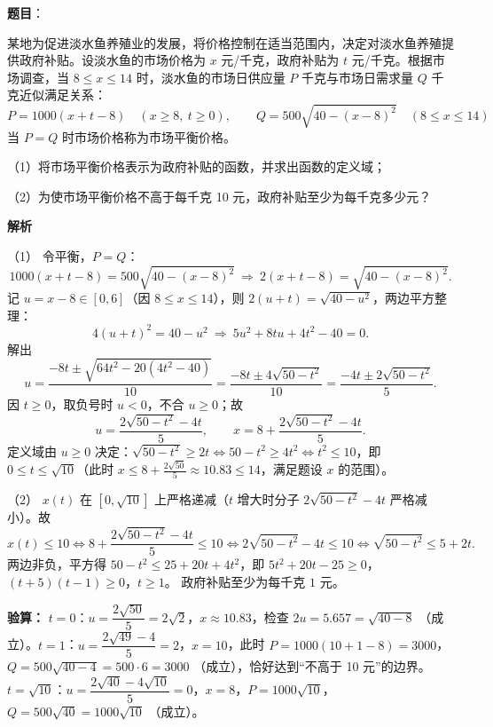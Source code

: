 \begin{answer}

\par\medskip

\end{answer}
\begin{answer}

\textbf{题目}：

某地为促进淡水鱼养殖业的发展，将价格控制在适当范围内，决定对淡水鱼养殖提供政府补贴。设淡水鱼的市场价格为 $x$ 元/千克，政府补贴为 $t$ 元/千克。根据市场调查，当 $8\le x\le14$ 时，淡水鱼的市场日供应量 $P$ 千克与市场日需求量 $Q$ 千克近似满足关系：
\nopagebreak[4]
\[
P=1000(x+t-8)\quad(x\ge8,\ t\ge0),\qquad
Q=500\sqrt{40-(x-8)^2}\quad(8\le x\le14)
\]
当 $P=Q$ 时市场价格称为市场平衡价格。

（1）将市场平衡价格表示为政府补贴的函数，并求出函数的定义域；

（2）为使市场平衡价格不高于每千克 10 元，政府补贴至少为每千克多少元？

\textbf{解析}

（1） 令平衡，$P=Q$：
\nopagebreak[4]
\[1000(x+t-8)=500\sqrt{40-(x-8)^2}\ \Longrightarrow\ 2(x+t-8)=\sqrt{40-(x-8)^2}.\]
记 $u=x-8\in[0,6]$（因 $8\le x\le14$），则 $2(u+t)=\sqrt{40-u^2}$，两边平方整理：
\nopagebreak[4]
\[4(u+t)^2=40-u^2\ \Longrightarrow\ 5u^2+8tu+4t^2-40=0.\]
解出
\nopagebreak[4]
\[u=\frac{-8t\pm\sqrt{64t^2-20(4t^2-40)}}{10}=\frac{-8t\pm4\sqrt{50-t^2}}{10}=\frac{-4t\pm2\sqrt{50-t^2}}{5}.\]
因 $t\ge0$，取负号时 $u<0$，不合 $u\ge0$；故
\nopagebreak[4]
\[u=\frac{2\sqrt{50-t^2}-4t}{5},\qquad x=8+\frac{2\sqrt{50-t^2}-4t}{5}.\]
定义域由 $u\ge0$ 决定：$\sqrt{50-t^2}\ge2t\iff 50-t^2\ge4t^2\iff t^2\le10$，即 $0\le t\le\sqrt{10}$（此时 $x\le8+\frac{2\sqrt{50}}{5}\approx10.83\le14$，满足题设 $x$ 的范围）。

（2） $x(t)$ 在 $[0,\sqrt{10}]$ 上严格递减（$t$ 增大时分子 $2\sqrt{50-t^2}-4t$ 严格减小）。故
\nopagebreak[4]
\[x(t)\le10\iff 8+\frac{2\sqrt{50-t^2}-4t}{5}\le10\iff 2\sqrt{50-t^2}-4t\le10\iff \sqrt{50-t^2}\le 5+2t.\]
两边非负，平方得 $50-t^2\le25+20t+4t^2$，即 $5t^2+20t-25\ge0$，$(t+5)(t-1)\ge0$，$t\ge1$。
政府补贴至少为每千克 $1$ 元。

\textbf{验算：} $t=0$：$u=\dfrac{2\sqrt{50}}{5}=2\sqrt2$，$x\approx10.83$，检查 $2u=5.657=\sqrt{40-8}$ （成立）。$t=1$：$u=\dfrac{2\sqrt{49}-4}{5}=2$，$x=10$，此时 $P=1000(10+1-8)=3000$，$Q=500\sqrt{40-4}=500\cdot6=3000$ （成立），恰好达到“不高于 10 元”的边界。$t=\sqrt{10}$：$u=\dfrac{2\sqrt{40}-4\sqrt{10}}{5}=0$，$x=8$，$P=1000\sqrt{10}$，$Q=500\sqrt{40}=1000\sqrt{10}$ （成立）。


\par\medskip

\end{answer}
